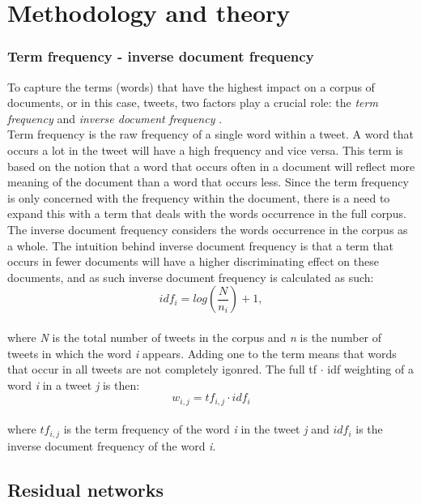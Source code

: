 \section{Methodology and theory}

\subsubsection{Term frequency - inverse document frequency}
To capture the terms (words) that have the highest impact on a corpus of documents, or in this case, tweets, two factors play a crucial role: the \textit{term frequency} and \textit{inverse document frequency} \cite{speech}.\\
Term frequency is the raw frequency of a single word within a tweet. A word that occurs a lot in the tweet will have a high frequency and vice versa. This term is based on the notion that a word that occurs often in a document will reflect more meaning of the document than a word that occurs less. Since the term frequency is only concerned with the frequency within the document, there is a need to expand this with a term that deals with the words occurrence in the full corpus.\\
The inverse document frequency considers the words occurrence in the corpus as a whole. The intuition behind inverse document frequency is that a term that occurs in fewer documents will have a higher discriminating effect on these documents, and as such inverse document frequency is calculated as such:\\
\begin{equation} 
id f_{i} = log \left(\dfrac{N}{n_{i}}\right)+1,
\end{equation}\\
where \textit{N} is the total number of tweets in the corpus and \textit{n} is the number of tweets in which the word \textit{i} appears. Adding one to the term means that words that occur in all tweets are not completely igonred. The full tf $\cdot$ idf weighting of a word \textit{i} in a tweet \textit{j} is then:\\
\begin{equation} 
w_{i,j}= tf_{i,j}\cdot id f_{i}
\end{equation}\\
where $tf_{i,j}$ is the term frequency of the word \textit{i} in the tweet \textit{j} and $id f_{i}$ is the inverse document frequency of the word \textit{i}.

\subsection{Residual networks}

